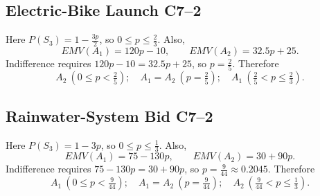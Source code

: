 \subsection{Electric-Bike Launch \hfill C7--2}
Here $P(S_3)=1-\frac{3p}{2}$, so $0\le p\le\frac23$. Also,
\[
EMV(A_1)=120p-10,\qquad EMV(A_2)=32.5p+25.
\]
Indifference requires $120p-10=32.5p+25$, so $p=\frac25$. Therefore
\[
\boxed{A_2\ (0\le p<\tfrac25);\quad A_1=A_2\ (p=\tfrac25);\quad A_1\ (\tfrac25<p\le\tfrac23).}
\]

\subsection{Rainwater-System Bid \hfill C7--2}
Here $P(S_3)=1-3p$, so $0\le p\le\frac13$. Also,
\[
EMV(A_1)=75-130p,\qquad EMV(A_2)=30+90p.
\]
Indifference requires $75-130p=30+90p$, so $p=\frac9{44}\approx0.2045$. Therefore
\[
\boxed{A_1\ (0\le p<\tfrac9{44});\quad A_1=A_2\ (p=\tfrac9{44});\quad A_2\ (\tfrac9{44}<p\le\tfrac13).}
\]


